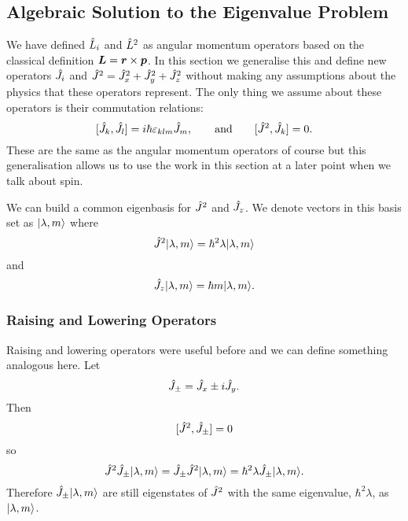 \subsection{Algebraic Solution to the Eigenvalue Problem}\label{sec:algebraic solution to the eigenvalue problem}
We have defined \(\hat{L}_i\) and \(\hat{L}^2\) as angular momentum operators based on the classical definition \(\bm{L} = \bm{r}\times\bm{p}\).
In this section we generalise this and define new operators \(\hat{J}_i\) and \(\hat{J}^2 = \hat{J}_x^2 + \hat{J}_y^2 + \hat{J}_z^2\) without making any assumptions about the physics that these operators represent.
The only thing we assume about these operators is their commutation relations:
\[[\hat{J}_k, \hat{J}_l] = i\hbar\varepsilon_{klm}\hat{J}_m, \qquad\text{and}\qquad [\hat{J}^2, \hat{J}_k] = 0.\]
These are the same as the angular momentum operators of course but this generalisation allows us to use the work in this section at a later point when we talk about spin.

We can build a common eigenbasis for \(\hat{J}^2\) and \(\hat{J}_z\).
We denote vectors in this basis set as \(\vert {\lambda, m} \rangle\) where
\[\hat{J}^2\vert {\lambda, m} \rangle = \hbar^2\lambda\vert {\lambda, m} \rangle\]
and
\[\hat{J}_z\vert {\lambda, m} \rangle = \hbar m\vert {\lambda, m} \rangle.\]

\subsubsection{Raising and Lowering Operators}
Raising and lowering operators were useful before and we can define something analogous here.
Let
\[\hat{J}_{\pm} = \hat{J}_x \pm i\hat{J}_y.\]
Then
\[[\hat{J}^2, \hat{J}_{\pm}] = 0\]
so
\[\hat{J}^2\hat{J}_{\pm}\vert {\lambda, m} \rangle = \hat{J}_{\pm}\hat{J}^2\vert {\lambda, m} \rangle = \hbar^2\lambda\hat{J}_{\pm}\vert {\lambda, m} \rangle.\]
Therefore \(\hat{J}_{\pm}\vert {\lambda, m} \rangle\) are still eigenstates of \(\hat{J}^2\) with the same eigenvalue, \(\hbar^2\lambda\), as \(\vert {\lambda, m} \rangle\).

